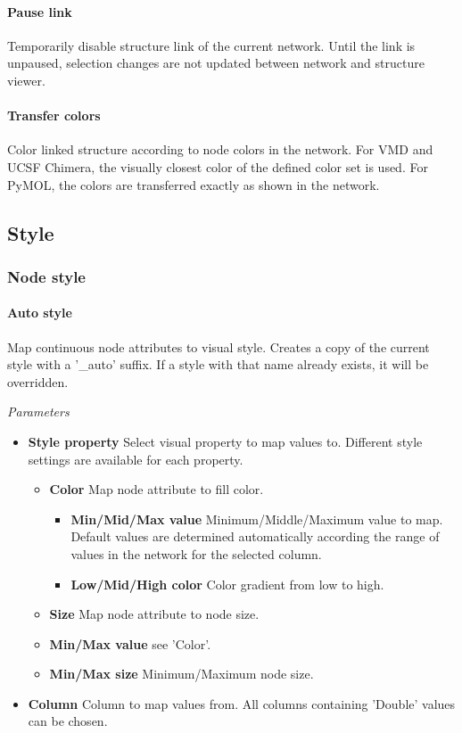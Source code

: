 \paragraph{Pause link} Temporarily disable structure link of the current network. Until the link is unpaused, selection changes are not updated between network and structure viewer. 

\paragraph{Transfer colors} Color linked structure according to node colors in the network. For VMD and UCSF Chimera, the visually closest color of the defined color set is used. For PyMOL, the colors are transferred exactly as shown in the network.

\subsection{Style}

\subsubsection{Node style}
\label{sec:node_style}

\paragraph{Auto style} Map continuous node attributes to visual style. Creates a copy of the current style with a '\_auto' suffix. If a style with that name already exists, it will be overridden.

\textit{Parameters}
\begin{itemize}
\item \textbf{Style property} Select visual property to map values to. Different style settings are available for each property.
  \begin{itemize}
  \item \textbf{Color} Map node attribute to fill color.
    \begin{itemize}
    \item \textbf{Min/Mid/Max value} Minimum/Middle/Maximum value to map. Default values are determined automatically according the range of values in the network for the selected column.
    \item \textbf{Low/Mid/High color} Color gradient from low to high.
    \end{itemize}
  \item \textbf{Size} Map node attribute to node size.
  \item \textbf{Min/Max value} see 'Color'.
  \item \textbf{Min/Max size} Minimum/Maximum node size.
  \end{itemize}
\item \textbf{Column} Column to map values from. All columns containing 'Double' values can be chosen.
\end{itemize}

